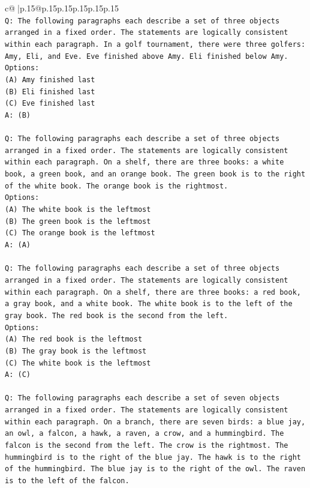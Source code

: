 \documentclass{article}
\begin{document}
{\begin{supertabular}{c@{$\;$}|p{.15\linewidth}@{}p{.15\linewidth}p{.15\linewidth}p{.15\linewidth}p{.15\linewidth}p{.15\linewidth}}
{{{\\ 
\texttt{Q: The following paragraphs each describe a set of three objects arranged in a fixed order. The statements are logically consistent within each paragraph. In a golf tournament, there were three golfers: Amy, Eli, and Eve. Eve finished above Amy. Eli finished below Amy.} \\
\texttt{Options:} \\
\texttt{(A) Amy finished last} \\
\texttt{(B) Eli finished last} \\
\texttt{(C) Eve finished last} \\
\texttt{A: (B)} \\
\\ 
\texttt{Q: The following paragraphs each describe a set of three objects arranged in a fixed order. The statements are logically consistent within each paragraph. On a shelf, there are three books: a white book, a green book, and an orange book. The green book is to the right of the white book. The orange book is the rightmost.} \\
\texttt{Options:} \\
\texttt{(A) The white book is the leftmost} \\
\texttt{(B) The green book is the leftmost} \\
\texttt{(C) The orange book is the leftmost} \\
\texttt{A: (A)} \\
\\ 
\texttt{Q: The following paragraphs each describe a set of three objects arranged in a fixed order. The statements are logically consistent within each paragraph. On a shelf, there are three books: a red book, a gray book, and a white book. The white book is to the left of the gray book. The red book is the second from the left.} \\
\texttt{Options:} \\
\texttt{(A) The red book is the leftmost} \\
\texttt{(B) The gray book is the leftmost} \\
\texttt{(C) The white book is the leftmost} \\
\texttt{A: (C)} \\
\\ 
\texttt{Q: The following paragraphs each describe a set of seven objects arranged in a fixed order. The statements are logically consistent within each paragraph. On a branch, there are seven birds: a blue jay, an owl, a falcon, a hawk, a raven, a crow, and a hummingbird. The falcon is the second from the left. The crow is the rightmost. The hummingbird is to the right of the blue jay. The hawk is to the right of the hummingbird. The blue jay is to the right of the owl. The raven is to the left of the falcon.} \\
}}}
\end{supertabular}}
\end{document}
